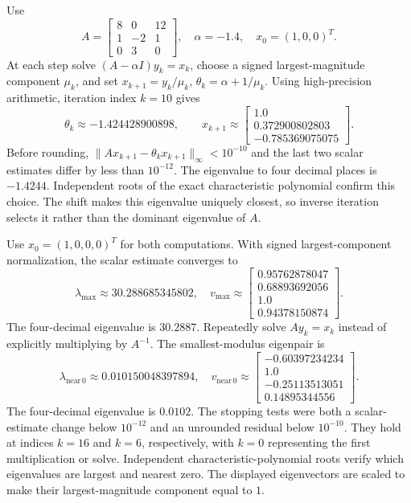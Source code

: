 Use
\[A=\left[\begin{matrix}8 & 0 & 12\\1 & -2 & 1\\0 & 3 & 0\end{matrix}\right],\quad \alpha=-1.4,\quad x_0=(1,0,0)^T.\]
At each step solve $(A-\alpha I)y_k=x_k$, choose a signed
largest-magnitude component $\mu_k$, and set
$x_{k+1}=y_k/\mu_k$, $\theta_k=\alpha+1/\mu_k$.
Using high-precision arithmetic, iteration index $k=10$ gives
\[\theta_k\approx-1.424428900898,\qquad
x_{k+1}\approx\left[\begin{matrix}1.0\\0.372900802803\\-0.785369075075\end{matrix}\right].\]
Before rounding, $\|Ax_{k+1}-\theta_kx_{k+1}\|_\infty<10^{-10}$
and the last two scalar estimates differ by less than $10^{-12}$.
The eigenvalue to four decimal places is $\boxed{-1.4244}$.
Independent roots of the exact characteristic polynomial confirm this
choice. The shift makes this eigenvalue uniquely closest, so inverse
iteration selects it rather than the dominant eigenvalue of $A$.

Use $x_0=(1,0,0,0)^T$ for both computations.
With signed largest-component normalization, the scalar estimate
converges to
\[\lambda_{\max}\approx30.288685345802,\quad
v_{\max}\approx\left[\begin{matrix}0.95762878047\\0.68893692056\\1.0\\0.94378150874\end{matrix}\right].\]
The four-decimal eigenvalue is $\boxed{30.2887}$.
Repeatedly solve $Ay_k=x_k$ instead of explicitly multiplying by
$A^{-1}$. The smallest-modulus eigenpair is
\[\lambda_{\mathrm{near}\,0}\approx0.010150048397894,\quad
v_{\mathrm{near}\,0}\approx\left[\begin{matrix}-0.60397234234\\1.0\\-0.25113513051\\0.14895344556\end{matrix}\right].\]
The four-decimal eigenvalue is $\boxed{0.0102}$.
The stopping tests were both a scalar-estimate change below $10^{-12}$
and an unrounded residual below $10^{-10}$. They hold at indices
$k=16$ and $k=6$, respectively, with $k=0$
representing the first multiplication or solve.
Independent characteristic-polynomial roots verify which eigenvalues
are largest and nearest zero. The displayed eigenvectors are scaled
to make their largest-magnitude component equal to $1$.

